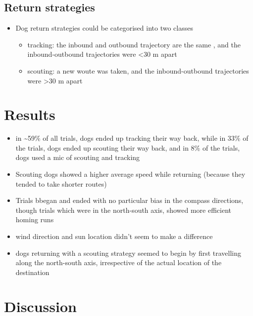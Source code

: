\documentclass[
]{book}
\providecommand{\tightlist}{%
  \setlength{\itemsep}{0pt}\setlength{\parskip}{0pt}}
\begin{document}
\hypertarget{return-strategies}{%
\subsection{Return strategies}\label{return-strategies}}

\begin{itemize}
\tightlist
\item
  Dog return strategies could be categorised into two classes

  \begin{itemize}
  \tightlist
  \item
    tracking: the inbound and outbound trajectory are the same , and the inbound-outbound trajectories were \textless30 m apart
  \item
    scouting: a new woute was taken, and the inbound-outbound trajectories were \textgreater30 m apart
  \end{itemize}
\end{itemize}

\hypertarget{results-3}{%
\section{Results}\label{results-3}}

\begin{itemize}
\tightlist
\item
  in \textasciitilde59\% of all trials, dogs ended up tracking their way back, while in 33\% of the trials, dogs ended up scouting their way back, and in 8\% of the trials, dogs used a mic of scouting and tracking
\item
  Scouting dogs showed a higher average speed while returning (because they tended to take shorter routes)
\item
  Trials bbegan and ended with no particular bias in the compass directions, though trials which were in the north-south axis, showed more efficient homing runs
\item
  wind direction and sun location didn't seem to make a difference
\item
  dogs returning with a scouting strategy seemed to begin by first travelling along the north-south axis, irrespective of the actual location of the destination
\end{itemize}

\hypertarget{discussion}{%
\section{Discussion}\label{discussion}}
\end{document}
